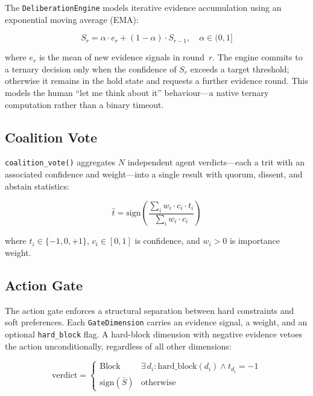 \documentclass[journal,10pt,twocolumn]{IEEEtran}
\begin{document}
The \texttt{DeliberationEngine} models iterative evidence accumulation using
an exponential moving average (EMA):

\begin{equation}
  S_r = \alpha \cdot e_r + (1-\alpha) \cdot S_{r-1},
  \quad \alpha \in (0, 1]
  \label{eq:ema}
\end{equation}

where $e_r$ is the mean of new evidence signals in round~$r$. The engine
commits to a ternary decision only when the confidence of $S_r$ exceeds a
target threshold; otherwise it remains in the hold state and requests a
further evidence round. This models the human ``let me think about it''
behaviour—a native ternary computation rather than a binary timeout.

\subsection{Coalition Vote}

\texttt{coalition\_vote()} aggregates $N$ independent agent verdicts—each a
trit with an associated confidence and weight—into a single result with
quorum, dissent, and abstain statistics:

\begin{equation}
  \hat{t} = \mathrm{sign}\!\left(
    \frac{\sum_i w_i \cdot c_i \cdot t_i}{\sum_i w_i \cdot c_i}
  \right)
  \label{eq:coalition}
\end{equation}

where $t_i \in \{-1,0,+1\}$, $c_i \in [0,1]$ is confidence, and
$w_i > 0$ is importance weight.

\subsection{Action Gate}

The action gate enforces a structural separation between hard constraints
and soft preferences. Each \texttt{GateDimension} carries an evidence
signal, a weight, and an optional \texttt{hard\_block} flag. A hard-block
dimension with negative evidence vetoes the action unconditionally,
regardless of all other dimensions:

\begin{equation}
  \text{verdict} = \begin{cases}
    \text{Block} & \exists\, d_i : \text{hard\_block}(d_i) \wedge t_{d_i} = -1 \\
    \text{sign}(\bar{S}) & \text{otherwise}
  \end{cases}
  \label{eq:gate}
\end{equation}
\end{document}
